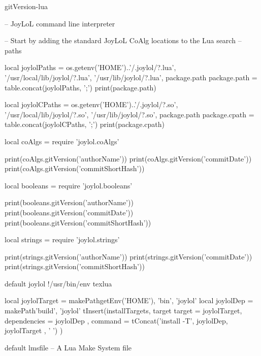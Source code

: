 
\startchapter[title=Preamble]


\component gitVersion-lua

\startLuaCode
-- JoyLoL command line interpreter 

-- Start by adding the standard JoyLoL CoAlg locations to the Lua search 
-- paths 

local joylolPaths = {
  os.getenv('HOME')..'/.joylol/?.lua',
  '/usr/local/lib/joylol/?.lua',
  '/usr/lib/joylol/?.lua',
  package.path
}
package.path = table.concat(joylolPaths, ';')
print(package.path)

local joylolCPaths = {
  os.getenv('HOME')..'/.joylol/?.so',
  '/usr/local/lib/joylol/?.so',
  '/usr/lib/joylol/?.so',
  package.path
}
package.cpath = table.concat(joylolCPaths, ';')
print(package.cpath)

local coAlgs = require 'joylol.coAlgs'

print(coAlgs.gitVersion('authorName'))
print(coAlgs.gitVersion('commitDate'))
print(coAlgs.gitVersion('commitShortHash'))

local booleans = require 'joylol.booleans'

print(booleans.gitVersion('authorName'))
print(booleans.gitVersion('commitDate'))
print(booleans.gitVersion('commitShortHash'))

local strings = require 'joylol.strings'

print(strings.gitVersion('authorName'))
print(strings.gitVersion('commitDate'))
print(strings.gitVersion('commitShortHash'))
\stopLuaCode


\createLuaCodeFile%
  {default}%
  {joylol}%
  {!/usr/bin/env texlua}



\startLmsfile
local joylolTarget = makePath{getEnv('HOME'), 'bin', 'joylol'}
local joylolDep    = makePath{'build', 'joylol'}
tInsert(installTargets, target{
  target       = joylolTarget,
  dependencies = { joylolDep },
  command      = tConcat({'install -T', joylolDep, joylolTarget }, ' ')
})
\stopLmsfile


\createLmsfileFile%
  {default}%
  {lmsfile}%
  {-- A Lua Make System file}

\stopchapter